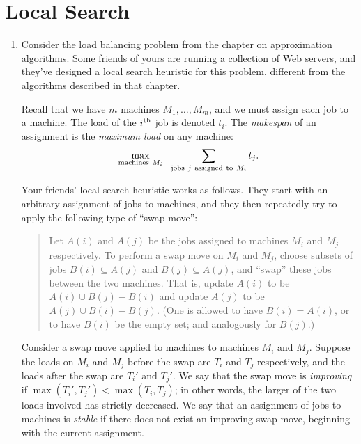 \documentclass[12pt]{article}
\begin{document}
\section{Local Search}


\begin{enumerate}


\item

Consider the load balancing problem from the chapter on approximation
algorithms.
Some friends of yours are running a collection of Web servers,
and they've designed a local search heuristic
for this problem, different from the algorithms described in that chapter.

Recall that we have $m$ machines $M_1, \ldots, M_m$,
and we must assign each job to a machine.
The load of the $i^{\rm th}$ job is denoted $t_i$.
The {\em makespan} of an assignment
is the {\em maximum load} on any machine:
$$\max_{{\rm machines}~M_i} ~~ \sum_{{\rm jobs}~j~{\rm assigned~to}~M_i} t_j.$$

Your friends' local search heuristic works as follows.
They start with an arbitrary assignment
of jobs to machines, and they then repeatedly try to apply the
following type of ``swap move'':
\begin{quote}
Let $A(i)$ and $A(j)$ be the jobs assigned to machines
$M_i$ and $M_j$ respectively.
To perform a swap move on $M_i$ and $M_j$,
choose subsets of jobs $B(i) \subseteq A(j)$
and $B(j) \subseteq A(j)$,
and ``swap'' these jobs between the two machines.
That is, update $A(i)$ to be $A(i) \cup B(j) - B(i)$
and update $A(j)$ to be $A(j) \cup B(i) - B(j)$.
(One is allowed to have $B(i) = A(i)$, or to have $B(i)$
be the empty set; and analogously for $B(j)$.)
\end{quote}

Consider a swap move applied to machines to machines $M_i$ and $M_j$.
Suppose the loads on $M_i$ and $M_j$ before the swap
are $T_i$ and $T_j$ respectively,
and the loads after the swap are $T_i'$ and $T_j'$.
We say that the swap move is {\em improving} if
$\max(T_i', T_j') < \max(T_i, T_j)$;
in other words, the larger of the two loads involved
has strictly decreased.
We say that an assignment of jobs to machines is
{\em stable} if there does not exist an improving swap move,
beginning with the current assignment.


\end{enumerate}
\end{document}

